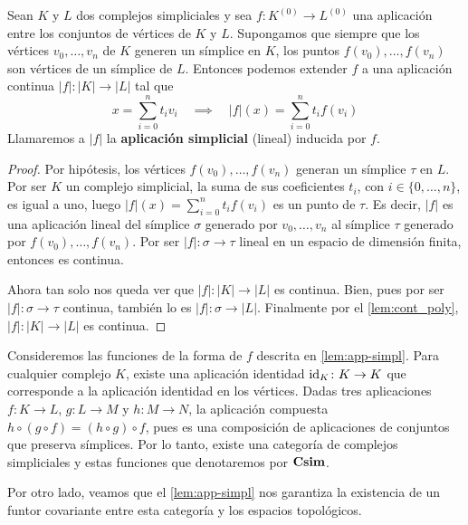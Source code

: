 \begin{lema}
	\label{lem:app-simpl} Sean $K$ y $L$ dos complejos simpliciales y sea $f: K^{(0)}
	\rightarrow L^{(0)}$ una aplicación entre los conjuntos de vértices de $K$ y $L$.
	Supongamos que siempre que los vértices $v_{0}, \ldots, v_{n}$ de $K$ generen
	un símplice en $K$, los puntos $f(v_{0}), \ldots, f(v_{n})$ son vértices de un
	símplice de $L$. Entonces podemos extender $f$ a una aplicación continua
	$|f| :|K| \rightarrow |L|$ tal que
	\[
	x = \sum_{i=0}^{n}t_{i}v_{i}\quad \implies \quad |f|(x) = \sum_{i=0}^{n}t_{i}
	f (v_{i})
	\]
	Llamaremos a $|f|$ la \textbf{aplicación simplicial} (lineal) inducida por $f$.
\end{lema}
\begin{proof}
	Por hipótesis, los vértices $f(v_{0}), \ldots, f(v_{n})$ generan un símplice
	$\tau$ en $L$. Por ser $K$ un complejo simplicial, la suma de sus coeficientes
	$t_{i}$, con $i \in \{0, \ldots, n\}$, es igual a uno, luego $|f|(x) = \sum_{i=0}
	^{n}t_{i}f(v_{i})$ es un punto de $\tau$. Es decir, $|f|$ es una aplicación lineal
	del símplice $\sigma$ generado por $v_{0}, \ldots, v_{n}$ al símplice $\tau$ generado
	por $f(v_{0}), \ldots, f(v_{n})$. Por ser $|f| : \sigma \rightarrow \tau$
	lineal en un espacio de dimensión finita, entonces es continua.
	
	Ahora tan solo nos queda ver que $|f| :|K| \rightarrow |L|$ es continua. Bien,
	pues por ser $|f| : \sigma \rightarrow \tau$ continua, también lo es
	$|f| : \sigma \rightarrow |L|$. Finalmente por el \autoref{lem:cont_poly},
	$|f| :|K| \rightarrow |L|$ es continua.
\end{proof}

Consideremos las funciones de la forma de $f$ descrita en \ref{lem:app-simpl}. Para
cualquier complejo $K$, existe una aplicación identidad $\operatorname{id}_{K} \colon K \to K$
que corresponde a la aplicación identidad en los vértices. Dadas tres aplicaciones
$f \colon K \to L$, $g \colon L \to M$ y $h : M \to N$, la aplicación compuesta $h
\circ (g \circ f) = (h \circ g) \circ f$, pues es una composición de
aplicaciones de conjuntos que preserva símplices. Por lo tanto, existe una
categoría de complejos simpliciales y estas funciones que denotaremos por
$\mathbf{Csim}$.

Por otro lado, veamos que el \autoref{lem:app-simpl} nos garantiza la existencia
de un funtor covariante entre esta categoría y los espacios topológicos.

